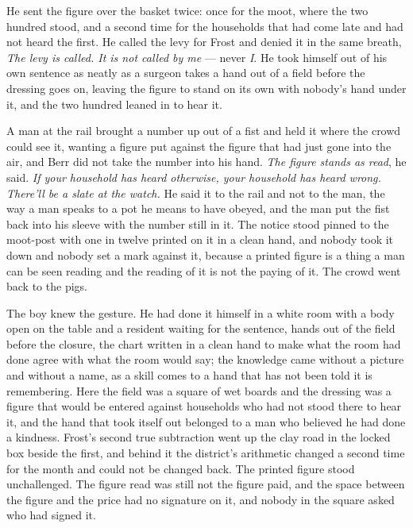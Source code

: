 He sent the figure over the basket twice: once for the moot, where the two hundred stood, and a second time for the households that had come late and had not heard the first. He called the levy for Frost and denied it in the same breath, \emph{The levy is called. It is not called by me} --- never \emph{I}. He took himself out of his own sentence as neatly as a surgeon takes a hand out of a field before the dressing goes on, leaving the figure to stand on its own with nobody's hand under it, and the two hundred leaned in to hear it.

A man at the rail brought a number up out of a fist and held it where the crowd could see it, wanting a figure put against the figure that had just gone into the air, and Berr did not take the number into his hand. \emph{The figure stands as read}, he said. \emph{If your household has heard otherwise, your household has heard wrong. There'll be a slate at the watch.} He said it to the rail and not to the man, the way a man speaks to a pot he means to have obeyed, and the man put the fist back into his sleeve with the number still in it. The notice stood pinned to the moot-post with one in twelve printed on it in a clean hand, and nobody took it down and nobody set a mark against it, because a printed figure is a thing a man can be seen reading and the reading of it is not the paying of it. The crowd went back to the pigs.

The boy knew the gesture. He had done it himself in a white room with a body open on the table and a resident waiting for the sentence, hands out of the field before the closure, the chart written in a clean hand to make what the room had done agree with what the room would say; the knowledge came without a picture and without a name, as a skill comes to a hand that has not been told it is remembering. Here the field was a square of wet boards and the dressing was a figure that would be entered against households who had not stood there to hear it, and the hand that took itself out belonged to a man who believed he had done a kindness. Frost's second true subtraction went up the clay road in the locked box beside the first, and behind it the district's arithmetic changed a second time for the month and could not be changed back. The printed figure stood unchallenged. The figure read was still not the figure paid, and the space between the figure and the price had no signature on it, and nobody in the square asked who had signed it.

